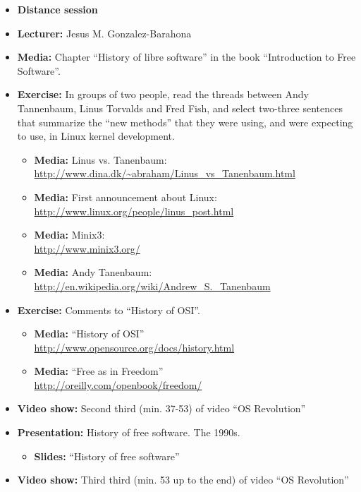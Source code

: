 \documentclass[a4paper]{article}
\begin{document}
\begin{itemize}
\item \textbf{Distance session}
\item \textbf{Lecturer:} Jesus M. Gonzalez-Barahona
\item \textbf{Media:} Chapter ``History of libre software'' in the book ``Introduction to Free Software''.
\item \textbf{Exercise:} In groups of two people, read the threads between Andy Tannenbaum, Linus Torvalds and Fred Fish, and select two-three sentences that summarize the ``new methods'' that they were using, and were expecting to use, in Linux kernel development.
  \begin{itemize}
  \item \textbf{Media:} Linus vs. Tanenbaum: \\
    \url{http://www.dina.dk/~abraham/Linus_vs_Tanenbaum.html}
  \item \textbf{Media:} First announcement about Linux: \\
    \url{http://www.linux.org/people/linus_post.html}
  \item \textbf{Media:} Minix3: \\
    \url{http://www.minix3.org/}
  \item \textbf{Media:} Andy Tanenbaum: \\
    \url{http://en.wikipedia.org/wiki/Andrew_S._Tanenbaum}
  \end{itemize}
\item \textbf{Exercise:} Comments to ``History of OSI''.
  \begin{itemize}
  \item \textbf{Media:} ``History of OSI'' \\
    \url{http://www.opensource.org/docs/history.html}
\item \textbf{Media:} ``Free as in Freedom'' \\
  \url{http://oreilly.com/openbook/freedom/}
  \end{itemize}
\item \textbf{Video show:} Second third (min. 37-53) of video ``OS Revolution''

\item \textbf{Presentation:} History of free software. The 1990s.
  \begin{itemize}
  \item \textbf{Slides:} ``History of free software''
  \end{itemize}

\item \textbf{Video show:} Third third (min. 53 up to the end) of video ``OS Revolution''


\end{itemize}
\end{document}
